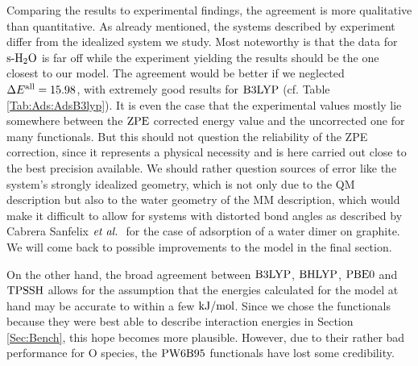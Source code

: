\documentclass[8.5pt,twoside,twocolumn]{article}
\newcommand\zpe{\enmat{\te{ZPE}}}
\newcommand\eall{\enmat{E^{\te{all}}}}
\newcommand\sur{\enmat{\te{s-}}}
\newcommand\tripot{\enmat{{^3\ot}}}
\newcommand\kmo{\enmat{\te {kJ/mol}}}
\theoremstyle{standard}
\begin{document}
Comparing the results to experimental findings, the agreement is more qualitative
than quantitative. As already mentioned, the systems described by experiment
differ from the idealized system we study. Most noteworthy is that the data for $\sur\hto$
is far off while the experiment yielding the results should be the one closest
to our model. The agreement would be better if we neglected $\Dl\eall=15.98$,
with extremely good results for $\text{B3LYP}$ (cf. Table \ref{Tab:Ads:AdsB3lyp}).
It is even the case that the experimental values mostly lie somewhere between
the $\zpe$ corrected energy value and the uncorrected one for many functionals.
But this should not question the reliability of the ZPE correction, since it
represents a physical necessity and is here carried out close to the best precision
available.
We should rather question sources of error like the system's strongly
idealized geometry, which is not only due to the QM description but also to
the water geometry of the MM description, which would make it difficult to
allow for systems with distorted bond angles as described by Cabrera Sanfelix $\emph{et al.}~$ 
\cite{CabreraSanfelix2003} for the case of adsorption of a water dimer on graphite.
We will come back to possible improvements to the model in the final section.


On the other hand, the broad agreement between $\text{B3LYP}$, $\text{BHLYP}$, $\text{PBE0}$
and $\text{TPSSH}$ allows for the assumption that the energies calculated for the
model at hand may be accurate to within a few $\kmo$. Since we chose
the functionals because they were best able to describe interaction
energies in Section \ref{Sec:Bench}, this hope becomes more plausible.
However, due to their rather bad performance for O species, the $\text{PW6B95}$
functionals have lost some credibility.


\end{document}
